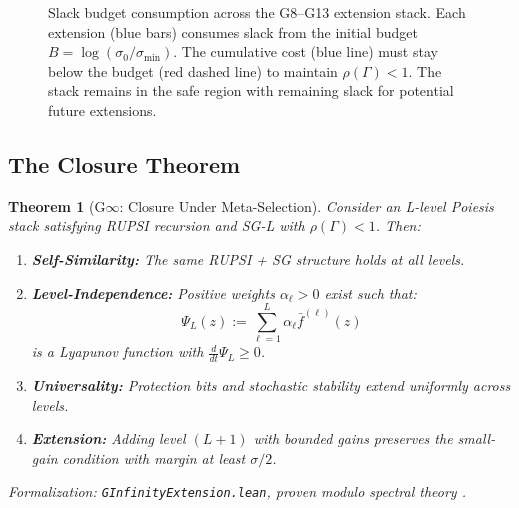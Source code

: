 \documentclass[12pt]{article}
\newtheorem{theorem}{Theorem}[section]
\begin{document}
\begin{figure}[h]
\caption{Slack budget consumption across the G8--G13 extension stack. Each extension (blue bars) consumes slack from the initial budget $B = \log(\sigma_0/\sigma_{\min})$. The cumulative cost (blue line) must stay below the budget (red dashed line) to maintain $\rho(\Gamma) < 1$. The stack remains in the safe region with remaining slack for potential future extensions.}
\label{fig:slack-budget}
\end{figure}

\subsection{The Closure Theorem}

\begin{theorem}[G$\infty$: Closure Under Meta-Selection]
\label{thm:g-infinity}
Consider an L-level Poiesis stack satisfying RUPSI recursion and SG-L with $\rho(\Gamma) < 1$. Then:
\begin{enumerate}
    \item[(a)] \textbf{Self-Similarity:} The same RUPSI + SG structure holds at all levels.
    
    \item[(b)] \textbf{Level-Independence:} Positive weights $\alpha_\ell > 0$ exist such that:
    \[
    \Psi_L(z) := \sum_{\ell=1}^L \alpha_\ell \bar{f}^{(\ell)}(z)
    \]
    is a Lyapunov function with $\frac{d}{dt} \Psi_L \geq 0$.
    
    \item[(c)] \textbf{Universality:} Protection bits and stochastic stability extend uniformly across levels.
    
    \item[(d)] \textbf{Extension:} Adding level $(L+1)$ with bounded gains preserves the small-gain condition with margin at least $\sigma/2$.
\end{enumerate}
\end{theorem}
\noindent\textit{Formalization: \texttt{GInfinityExtension.lean}, proven modulo spectral theory \citep{horn2012matrix}.}
\end{document}
